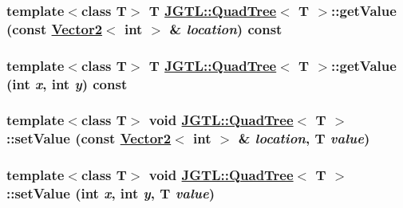 \hypertarget{class_j_g_t_l_1_1_quad_tree_862ebd81b3404cbf8e79098e6562e9df}{
\subsubsection[getValue]{\setlength{\rightskip}{0pt plus 5cm}template$<$class T$>$ T \hyperlink{class_j_g_t_l_1_1_quad_tree}{JGTL::Quad\-Tree}$<$ T $>$::get\-Value (const \hyperlink{class_j_g_t_l_1_1_vector2}{Vector2}$<$ int $>$ \& {\em location}) const}}
\label{class_j_g_t_l_1_1_quad_tree_862ebd81b3404cbf8e79098e6562e9df}


\hypertarget{class_j_g_t_l_1_1_quad_tree_0bbb593bc2e26939a5149008391d8a7f}{
\subsubsection[getValue]{\setlength{\rightskip}{0pt plus 5cm}template$<$class T$>$ T \hyperlink{class_j_g_t_l_1_1_quad_tree}{JGTL::Quad\-Tree}$<$ T $>$::get\-Value (int {\em x}, int {\em y}) const}}
\label{class_j_g_t_l_1_1_quad_tree_0bbb593bc2e26939a5149008391d8a7f}


\hypertarget{class_j_g_t_l_1_1_quad_tree_a209ae18d1b045e6ca3264bc9498b9ed}{
\subsubsection[setValue]{\setlength{\rightskip}{0pt plus 5cm}template$<$class T$>$ void \hyperlink{class_j_g_t_l_1_1_quad_tree}{JGTL::Quad\-Tree}$<$ T $>$::set\-Value (const \hyperlink{class_j_g_t_l_1_1_vector2}{Vector2}$<$ int $>$ \& {\em location}, T {\em value})}}
\label{class_j_g_t_l_1_1_quad_tree_a209ae18d1b045e6ca3264bc9498b9ed}


\hypertarget{class_j_g_t_l_1_1_quad_tree_04258020bf56d8828dc85e7dfa1fce71}{
\subsubsection[setValue]{\setlength{\rightskip}{0pt plus 5cm}template$<$class T$>$ void \hyperlink{class_j_g_t_l_1_1_quad_tree}{JGTL::Quad\-Tree}$<$ T $>$::set\-Value (int {\em x}, int {\em y}, T {\em value})}}
\label{class_j_g_t_l_1_1_quad_tree_04258020bf56d8828dc85e7dfa1fce71}


